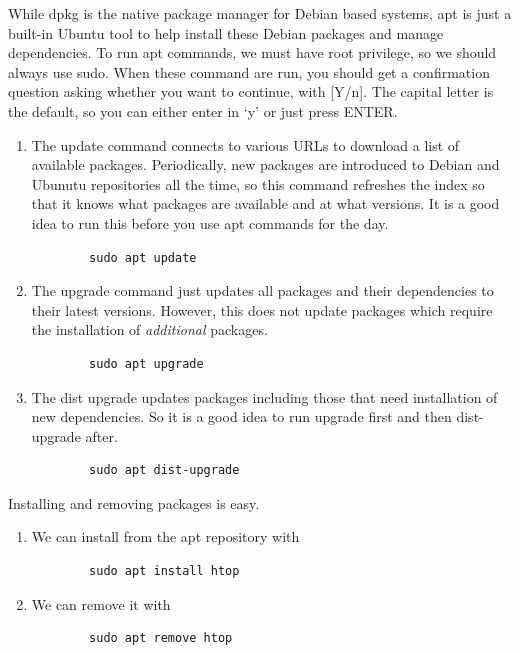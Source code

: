 \documentclass{article}
\begin{document}
    While dpkg is the native package manager for Debian based systems, apt is just a built-in Ubuntu tool to help install these Debian packages and manage dependencies. To run apt commands, we must have root privilege, so we should always use sudo. When these command are run, you should get a confirmation question asking whether you want to continue, with [Y/n]. The capital letter is the default, so you can either enter in `y' or just press ENTER. 
    \begin{enumerate}
      \item The update command connects to various URLs to download a list of available packages. Periodically, new packages are introduced to Debian and Ubunutu repositories all the time, so this command refreshes the index so that it knows what packages are available and at what versions. It is a good idea to run this before you use apt commands for the day. 
      \begin{lstlisting}
        sudo apt update
      \end{lstlisting}

      \item The upgrade command just updates all packages and their dependencies to their latest versions. However, this does not update packages which require the installation of \textit{additional} packages. 
      \begin{lstlisting}
        sudo apt upgrade 
      \end{lstlisting}

      \item The dist upgrade updates packages including those that need installation of new dependencies. So it is a good idea to run upgrade first and then dist-upgrade after.  
      \begin{lstlisting}
        sudo apt dist-upgrade 
      \end{lstlisting}
    \end{enumerate}

    Installing and removing packages is easy. 

    \begin{enumerate}
      \item We can install from the apt repository with 
      \begin{lstlisting}
        sudo apt install htop
      \end{lstlisting}

      \item We can remove it with 
      \begin{lstlisting}
        sudo apt remove htop
      \end{lstlisting}
    \end{enumerate}
\end{document}
